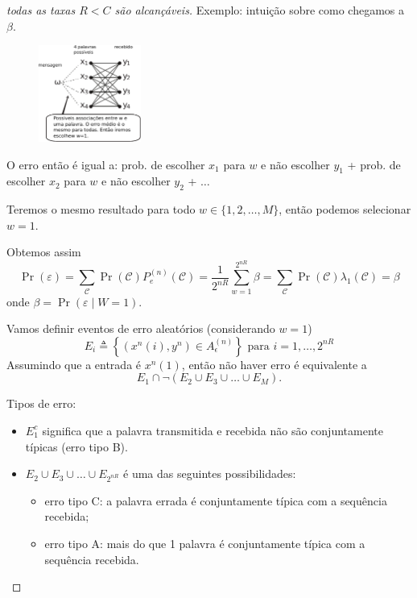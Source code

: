 \begin{frame}[allowframebreaks]
\begin{proof}[todas as taxas $R < C$ são alcançáveis]
  \proofbreak

  Exemplo: intuição sobre como chegamos a $\beta$. 

                \begin{figure}[h!]
                \centering
                \includegraphics[width=0.3\textwidth]{images/wxyass.pdf}
                \label{fig:wxyass}
                \end{figure}

  \proofbreak
  
  O erro então é igual a: prob. de escolher $x_1$ para $w$ e não escolher $y_1$ + 
			prob. de escolher $x_2$ para $w$ e não escolher $y_2$ + $\ldots$
 
  Teremos o mesmo resultado para todo $w \in \{1,2,\ldots,M\}$, então podemos selecionar $w=1$.

  Obtemos assim
  \begin{equation}
  \Pr(\varepsilon) = \sum_{\mathcal{C}} \Pr(\mathcal{C}) P_e^{(n)}(\mathcal{C}) =  \frac{1}{2^{nR}} \sum_{w=1}^{2^{nR}} \beta = \sum_{\mathcal{C}} \Pr(\mathcal{C}) \lambda_1(\mathcal{C}) = \beta
  \end{equation}
   onde $\beta = \Pr(\varepsilon \mid W=1)$.

  \proofbreak

  Vamos definir eventos de erro aleatórios (considerando $w=1$)
  \begin{equation}
  E_i \triangleq \left\{ (x^n(i),y^n) \in A_{\epsilon}^{(n)} \right\} \text{ para } i=1,\ldots,2^{nR}
  \end{equation}
  Assumindo que a entrada é $x^n(1)$, então não haver erro é equivalente a
  \begin{equation}
  E_1 \cap \neg (E_2 \cup E_3 \cup \ldots \cup E_M).
  \end{equation}
 
  \proofbreak

  Tipos de erro:
  \begin{itemize}
  \item $E_1^c$ significa que a palavra transmitida e recebida não são conjuntamente típicas (erro tipo B).
  \item $E_2 \cup E_3 \cup \ldots \cup E_{2^{nR}}$ é uma das seguintes possibilidades:
	\begin{itemize}
	\item erro tipo C: a palavra errada é conjuntamente típica com a sequência recebida;
	\item erro tipo A: mais do que 1 palavra é conjuntamente típica com a sequência recebida.
	\end{itemize}
  \end{itemize}


\end{proof}
\end{frame}

